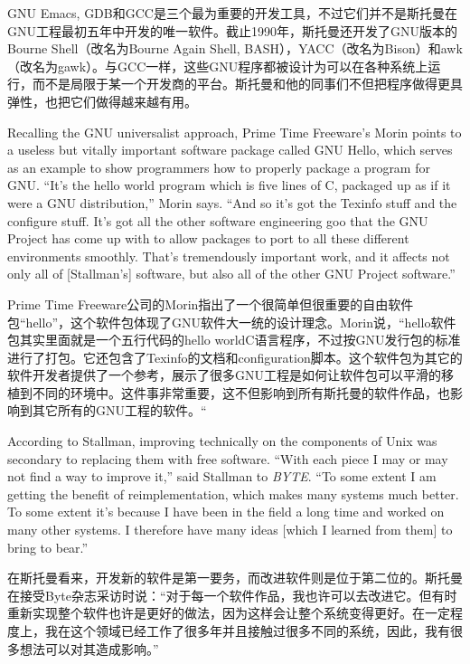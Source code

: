 \ifdefined\chs
GNU Emacs, GDB和GCC是三个最为重要的开发工具，不过它们并不是斯托曼在GNU工程最初五年中开发的唯一软件。截止1990年，斯托曼还开发了GNU版本的Bourne Shell（改名为Bourne Again Shell, BASH），YACC（改名为Bison）和awk（改名为gawk）。与GCC一样，这些GNU程序都被设计为可以在各种系统上运行，而不是局限于某一个开发商的平台。斯托曼和他的同事们不但把程序做得更具弹性，也把它们做得越来越有用。
\fi

\ifdefined\eng
Recalling the GNU universalist approach, Prime Time Freeware's Morin points to a useless but vitally important software package called GNU Hello, which serves as an example to show programmers how to properly package a program for GNU. ``It's the hello world program which is five lines of C, packaged up as if it were a GNU distribution,'' Morin says. ``And so it's got the Texinfo stuff and the configure stuff. It's got all the other software engineering goo that the GNU Project has come up with to allow packages to port to all these different environments smoothly. That's tremendously important work, and it affects not only all of [Stallman's] software, but also all of the other GNU Project software.''
\fi

\ifdefined\chs
Prime Time Freeware公司的Morin指出了一个很简单但很重要的自由软件包“hello”，这个软件包体现了GNU软件大一统的设计理念。Morin说，“hello软件包其实里面就是一个五行代码的hello worldC语言程序，不过按GNU发行包的标准进行了打包。它还包含了Texinfo的文档和configuration脚本。这个软件包为其它的软件开发者提供了一个参考，展示了很多GNU工程是如何让软件包可以平滑的移植到不同的环境中。这件事非常重要，这不但影响到所有斯托曼的软件作品，也影响到其它所有的GNU工程的软件。“
\fi

\ifdefined\eng
According to Stallman, improving technically on the components of Unix was secondary to replacing them with free software. ``With each piece I may or may not find a way to improve it,'' said Stallman to \textit{BYTE}. ``To some extent I am getting the benefit of reimplementation, which makes many systems much better. To some extent it's because I have been in the field a long time and worked on many other systems. I therefore have many ideas [which I learned from them] to bring to bear.''
\fi

\ifdefined\chs
在斯托曼看来，开发新的软件是第一要务，而改进软件则是位于第二位的。斯托曼在接受Byte杂志采访时说：“对于每一个软件作品，我也许可以去改进它。但有时重新实现整个软件也许是更好的做法，因为这样会让整个系统变得更好。在一定程度上，我在这个领域已经工作了很多年并且接触过很多不同的系统，因此，我有很多想法可以对其造成影响。”
\fi

